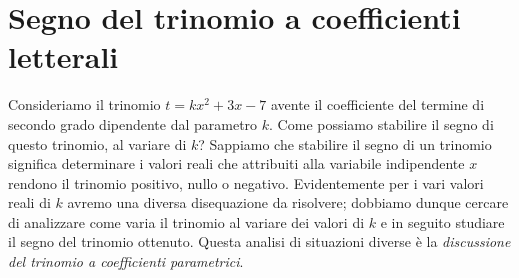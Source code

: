 \section{Segno del trinomio a coefficienti letterali}

Consideriamo il trinomio $t=kx^2+3x-7$ avente il coefficiente del termine di secondo grado dipendente dal parametro $k$. Come possiamo stabilire il segno di questo trinomio, al variare di $k$?
Sappiamo che stabilire il segno di un trinomio significa determinare i valori reali che attribuiti alla variabile indipendente $x$ rendono il trinomio positivo, nullo o negativo. Evidentemente per i vari valori reali di $k$ avremo una diversa disequazione da risolvere; dobbiamo dunque cercare di analizzare come varia il trinomio al variare dei valori di $k$ e in seguito studiare il segno del trinomio ottenuto. Questa analisi di situazioni diverse è la \textit{discussione del trinomio a coefficienti parametrici}.

